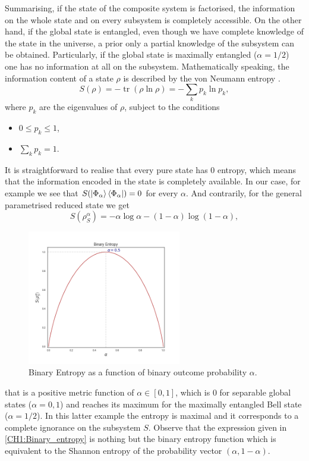 \indent Summarising, if the state of the composite system is factorised, the information on the whole state and on every subsystem is completely accessible. On the other hand, if the global state is entangled, even though we have complete knowledge of the state in the universe, a prior only a partial knowledge of the subsystem can be obtained. Particularly, if the global state is maximally entangled ($\alpha=1/2$) one has no information at all on the subsystem. Mathematically speaking, the information content of a state $\rho$ is described by the von Neumann entropy \cite{von_neumann_mathematical_1955}.
\begin{equation}
S(\rho)=-\operatorname{tr}(\rho \ln \rho)=-\sum_{k} p_{k} \ln p_{k},
\label{CH1:von_neumann_entropy}
\end{equation}
where $p_k$ are the eigenvalues of $\rho$, subject to the conditions
\begin{itemize}
\item $0\leq p_k\leq 1$,
\item $\sum_{k} p_k =1$.
\end{itemize}
\indent It is straightforward to realise that every pure state has $0$ entropy, which means that the information encoded in the state is completely available. In our case, for example we see that $S(\mathinner{|{\Phi_\alpha}\rangle}\mathinner{\langle{\Phi_\alpha}|})=0$ for every $\alpha$. And contrarily, for the general parametrised reduced state we get
\begin{equation}
S\left(\rho_{S}^{\alpha}\right)=-\alpha \log \alpha-(1-\alpha) \log (1-\alpha),
\label{CH1:Binary_entropy}
\end{equation}
\begin{figure}[h!]
\centering
\includegraphics[width=0.6\textwidth]{Figures/Binary_entropy.png}
\caption{Binary Entropy  as a function of binary outcome probability $\alpha$.}
\end{figure}
that is a positive metric function of $\alpha\in [0,1]$, which is 0 for separable global states ($\alpha=0,1$) and reaches its maximum for the maximally entangled Bell state ($\alpha=1/2$). In this latter example the entropy is maximal and it corresponds to a complete ignorance on the subsystem $S$. Observe that the expression given in \eqref{CH1:Binary_entropy} is nothing but the binary entropy function \cite{mackay_information_2003} which is equivalent to the Shannon entropy \cite{shannon_mathematical_1948} of the probability vector $(\alpha,1-\alpha)$.\\

